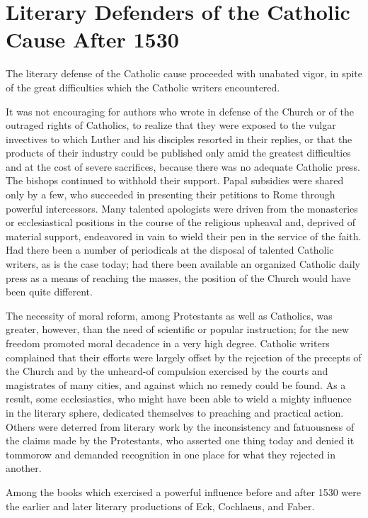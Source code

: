 \section{Literary Defenders of the Catholic Cause After 1530}

The literary defense of the Catholic cause proceeded with unabated
vigor, in spite of the great difficulties which the Catholic writers encountered.

It was not encouraging for authors who wrote in defense of the
Church or of the outraged rights of Catholics, to realize that they
were exposed to the vulgar invectives to which Luther and his disciples
resorted in their replies, or that the products of their industry
could be published only amid the greatest difficulties and at the cost
of severe sacrifices, because there was no adequate Catholic press. The
bishops continued to withhold their support. Papal subsidies were
shared only by a few, who succeeded in presenting their petitions to
Rome through powerful intercessors. Many talented apologists were
driven from the monasteries or ecclesiastical positions in the course of
the religious upheaval and, deprived of material support, endeavored
in vain to wield their pen in the service of the faith. Had there been
a number of periodicals at the disposal of talented Catholic writers, as
is the case today; had there been available an organized Catholic
daily press as a means of reaching the masses, the position of the
Church would have been quite different.

The necessity of moral reform, among Protestants as well as
Catholics, was greater, however, than the need of scientific or popular
instruction; for the new freedom promoted moral decadence in a
very high degree. Catholic writers complained that their efforts were
largely offset by the rejection of the precepts of the Church and by
the unheard-of compulsion exercised by the courts and magistrates of
many cities, and against which no remedy could be found. As a result,
some ecclesiastics, who might have been able to wield a mighty influence
in the literary sphere, dedicated themselves to preaching and
practical action. Others were deterred from literary work by the inconsistency
and fatuousness of the claims made by the Protestants,
who asserted one thing today and denied it tommorow and demanded
recognition in one place for what they rejected in another.

Among the books which exercised a powerful influence before and
after 1530 were the earlier and later literary productions of Eck,
Cochlaeus, and Faber.

